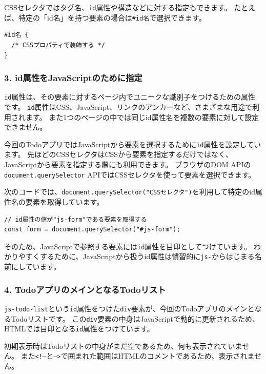 CSSセレクタではタグ名、\texttt{id}属性や構造などに対する指定もできます。
たとえば、特定の「id名」を持つ要素の場合は\texttt{\#id名}で選択できます。

\begin{lstlisting}
#id名 {
  /* CSSプロパティで装飾する */
}
\end{lstlisting}

\hypertarget{comment-id-for-js}{%
\subsubsection{3. id属性をJavaScriptのために指定}\label{comment-id-for-js}}

\texttt{id}属性は、その要素に対するページ内でユニークな識別子をつけるための属性です。
\texttt{id}属性はCSS、JavaScript、リンクのアンカーなど、さまざまな用途で利用されます。
また1つのページの中では同じid属性名を複数の要素に対して設定できません。

今回のTodoアプリではJavaScriptから要素を選択するために\texttt{id}属性を設定しています。
先ほどのCSSセレクタはCSSから要素を指定するだけではなく、JavaScriptから要素を指定する際にも利用できます。
ブラウザのDOM APIの\texttt{document.querySelector}
APIではCSSセレクタを使って要素を選択できます。

次のコードでは、\texttt{document.querySelector("CSSセレクタ")}を利用して特定のid属性名の要素を取得しています。

\begin{lstlisting}
// id属性の値が"js-form"である要素を取得する
const form = document.querySelector("#js-form");
\end{lstlisting}

そのため、JavaScriptで参照する要素には\texttt{id}属性を目印としてつけています。
わかりやすくするために、JavaScriptから扱うid属性は慣習的に\texttt{js-}からはじまる名前にしています。

\hypertarget{comment-todo-list}{%
\subsubsection{4. TodoアプリのメインとなるTodoリスト}\label{comment-todo-list}}

\texttt{js-todo-list}という\texttt{id}属性をつけた\texttt{div}要素が、今回のTodoアプリのメインとなるTodoリストです。
この\texttt{div}要素の中身はJavaScriptで動的に更新されるため、HTMLでは目印となる\texttt{id}属性をつけています。

初期表示時はTodoリストの中身がまだ空であるため、何も表示されていません。
また\texttt{<!--}と\texttt{-->}で囲まれた範囲はHTMLのコメントであるため、表示されません。

